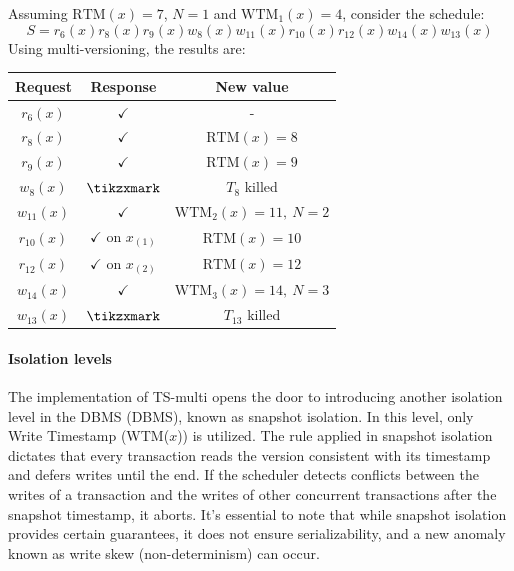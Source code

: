 \begin{example}
    Assuming $\text{RTM}(x)=7$, $N=1$ and $\text{WTM}_1(x)=4$, consider the schedule:
    \[S=r_6(x) r_8(x) r_9(x) w_8(x) w_{11}(x) r_{10}(x) r_{12}(x) w_{14}(x) w_{13}(x)\]
    Using multi-versioning, the results are:
    \begin{table}[H]
        \centering
        \begin{tabular}{ccc}
        \textbf{Request} & \textbf{Response}         & \textbf{New value}  \\ \hline
        $r_6(x)$         & $\checkmark$              & -                   \\
        $r_8(x)$         & $\checkmark$              & $\text{RTM}(x)=8$          \\
        $r_9(x)$         & $\checkmark$              & $\text{RTM}(x)=9$          \\
        $w_8(x)$         & $\tikzxmark$              & $T_8$ killed        \\
        $w_{11}(x)$      & $\checkmark$              & $\text{WTM}_2(x)=11,\:N=2$ \\
        $r_{10}(x)$      & $\checkmark$ on $x_{(1)}$ & $\text{RTM}(x)=10$         \\
        $r_{12}(x)$      & $\checkmark$ on $x_{(2)}$ & $\text{RTM}(x)=12$         \\
        $w_{14}(x)$      & $\checkmark$              & $\text{WTM}_3(x)=14,\:N=3$ \\
        $w_{13}(x)$      & $\tikzxmark$              & $T_{13}$ killed
        \end{tabular}
    \end{table}
\end{example}

\paragraph*{Isolation levels}
The implementation of TS-multi opens the door to introducing another isolation level in the DBMS (DBMS), known as snapshot isolation.
In this level, only Write Timestamp (WTM($x$)) is utilized.
The rule applied in snapshot isolation dictates that every transaction reads the version consistent with its timestamp and defers writes until the end. 
If the scheduler detects conflicts between the writes of a transaction and the writes of other concurrent transactions after the snapshot timestamp, it aborts.
It's essential to note that while snapshot isolation provides certain guarantees, it does not ensure serializability, and a new anomaly known as write skew (non-determinism) can occur.